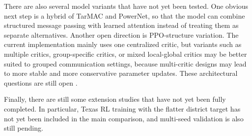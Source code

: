 There are also several model variants that have not yet been tested. One obvious
next step is a hybrid of TarMAC and PowerNet, so that the model can combine
structured message passing with learned attention instead of treating them as
separate alternatives. Another open direction is PPO-structure variation. The
current implementation mainly uses one centralized critic, but variants such as
multiple critics, group-specific critics, or mixed local-global critics may be
better suited to grouped communication settings, because multi-critic designs
may lead to more stable and more conservative parameter updates. These
architectural questions are still open \cite{maddpg2017,centralizedCritics2023}.

Finally, there are still some extension studies that have not yet been fully
completed. In particular, Texas RL training with the flatter district target
has not yet been included in the main comparison, and multi-seed validation is
also still pending.
